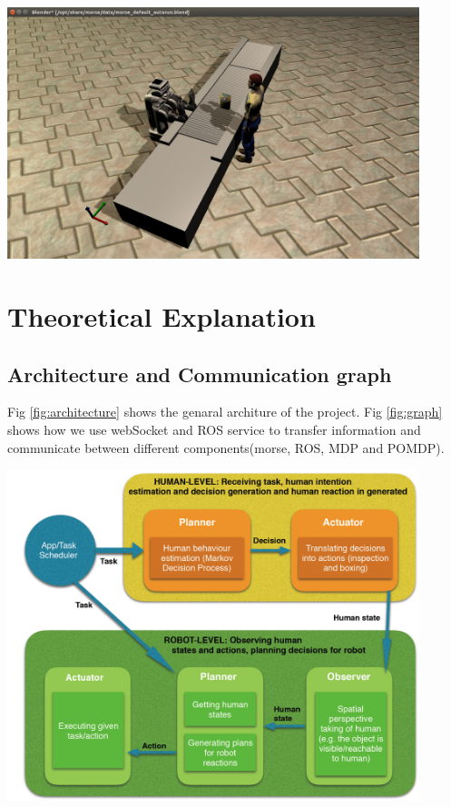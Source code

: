 \begin{enumerate}
\begin{minipage}{0.8\textwidth}
\centering
	\includegraphics[width=12cm]{Pictures/run/morsescenario.png}
	\label{fig:morsescenario}
\end{minipage}

\end{enumerate}

\chapter{Theoretical Explanation} 

\section{Architecture and Communication graph}
Fig \ref{fig:architecture} shows the genaral architure of the project. Fig \ref{fig:graph} shows how we use webSocket and ROS service to transfer information and communicate between different components(morse, ROS, MDP and POMDP).

\begin{minipage}{0.8\textwidth}
\centering
	\includegraphics[width=12cm]{Pictures/func/architecture.png}
	\label{fig:architecture}
\end{minipage}

